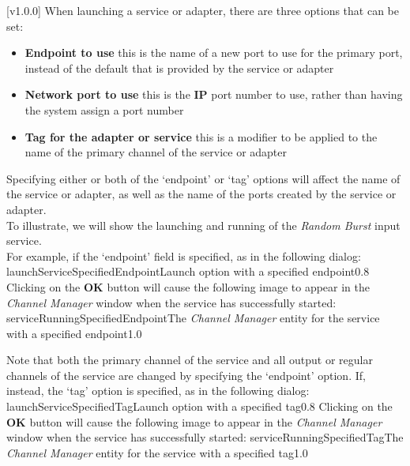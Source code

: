 [v1.0.0]
When launching a service or adapter, there are three options that can be set:
\begin{itemize}
\item\textbf{Endpoint to use} this is the name of a new \yarp{} port to use for the
primary port, instead of the default that is provided by the service or adapter
\item\exSp\textbf{Network port to use} this is the \textbf{IP} port number to use, rather
than having the system assign a port number
\item\exSp\textbf{Tag for the adapter or service} this is a modifier to be applied to the
name of the primary channel of the service or adapter
\end{itemize}

Specifying either or both of the `endpoint' or `tag' options will affect the name of the
service or adapter, as well as the name of the \yarp{} ports created by the service or
adapter.\\

To illustrate, we will show the launching and running of the \emph{Random Burst} input
service.\\

For example, if the `endpoint' field is specified, as in the following dialog:
%
{launchServiceSpecifiedEndpoint}{Launch option with a specified endpoint}{0.8}
\condPage{}
Clicking on the \textbf{OK} button will cause the following image to appear in the
\emph{Channel Manager} window when the service has successfully started:
%
{serviceRunningSpecifiedEndpoint}{The \emph{Channel Manager} entity for the service with a
specified endpoint}{1.0}

Note that both the primary channel of the service and all output or regular channels of
the service are changed by specifying the `endpoint' option.
If, instead, the `tag' option is specified, as in the following dialog:
%
{launchServiceSpecifiedTag}{Launch option with a specified tag}{0.8}
\condPage{}
Clicking on the \textbf{OK} button will cause the following image to appear in the
\emph{Channel Manager} window when the service has successfully started:
%
{serviceRunningSpecifiedTag}{The \emph{Channel Manager} entity for the service with a
specified tag}{1.0}

